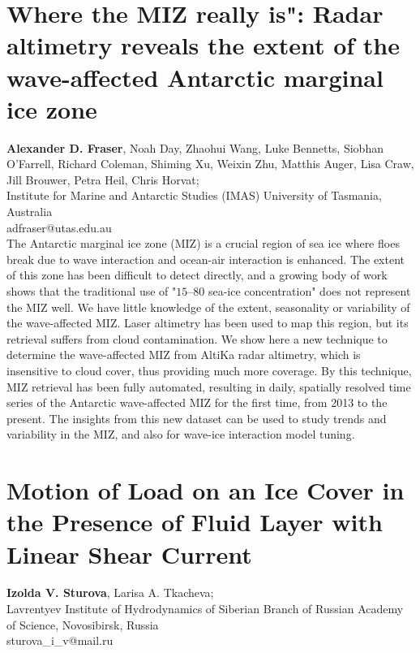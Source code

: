 \documentclass[9pt,a4paper,oneside]{book}
\numberwithin{equation}{section}
\begin{document}
 \section*{Where the MIZ really is": Radar altimetry reveals the extent of the wave-affected Antarctic marginal ice zone}
 \label{abs:2}
  {\bf Alexander D. Fraser}, Noah Day, Zhaohui Wang, Luke Bennetts, Siobhan O'Farrell, Richard Coleman, Shiming Xu, Weixin Zhu, Matthis Auger, Lisa Craw, Jill Brouwer, Petra Heil, Chris Horvat;\\
 Institute for Marine and Antarctic Studies (IMAS)
University of Tasmania, Australia\\
adfraser@utas.edu.au\\

The Antarctic marginal ice zone (MIZ) is a crucial region of sea ice where floes break due to wave interaction and ocean-air interaction is enhanced. The extent of this zone has been difficult to detect directly, and a growing body of work shows that the traditional use of "$15$–$80$ sea-ice concentration" does not represent the MIZ well. We have little knowledge of the extent, seasonality or variability of the wave-affected MIZ. Laser altimetry has been used to map this region, but its retrieval suffers from cloud contamination. We show here a new technique to determine the wave-affected MIZ from AltiKa radar altimetry, which is insensitive to cloud cover, thus providing much more coverage. By this technique, MIZ retrieval has been fully automated, resulting in daily, spatially resolved time series of the Antarctic wave-affected MIZ for the first time, from 2013 to the present. The insights from this new dataset can be used to study trends and variability in the MIZ, and also for wave-ice interaction model tuning.

\section*{Motion of Load on an Ice Cover in the Presence of Fluid Layer with Linear Shear Current}
 \label{abs:3}
  {\bf Izolda V. Sturova}, Larisa A. Tkacheva;\\
Lavrentyev Institute of Hydrodynamics of Siberian Branch of Russian Academy of Science, Novosibirsk, Russia\\
sturova\_i\_v@mail.ru\\
\end{document}
